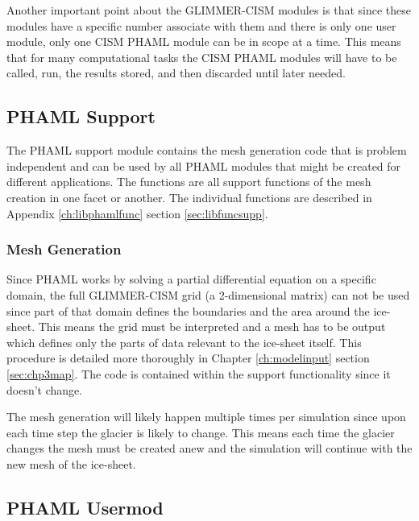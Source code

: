 Another important point about the GLIMMER-CISM modules is that since these modules have a specific number associate with them and there is only one user module, only one CISM PHAML module can be in scope at a time.  This means that for many computational tasks the CISM PHAML modules will have to be called, run, the results stored, and then discarded until later needed.


\subsection{PHAML Support}\label{sec:ch4supp} 

The PHAML support module contains the mesh generation code that is problem independent and can be used by all PHAML modules that might be created for different applications.  The functions are all support functions of the mesh creation in one facet or another.  The individual functions are described in Appendix \ref{ch:libphamlfunc} section \ref{sec:libfuncsupp}.


\subsubsection{Mesh Generation}

Since PHAML works by solving a partial differential equation on a specific domain, the full GLIMMER-CISM grid (a 2-dimensional matrix) can not be used since part of that domain defines the boundaries and the area around the ice-sheet.  This means the grid must be interpreted and a mesh has to be output which defines only the parts of data relevant to the ice-sheet itself.  This procedure is detailed more thoroughly in Chapter \ref{ch:modelinput} section \ref{sec:chp3map}.  The code is contained within the support functionality since it doesn't change.  

The mesh generation will likely happen multiple times per simulation since upon each time step the glacier is likely to change.  This means each time the glacier changes the mesh must be created anew and the simulation will continue with the new mesh of the ice-sheet.


\subsection{PHAML Usermod}\label{sec:ch4usermod}

